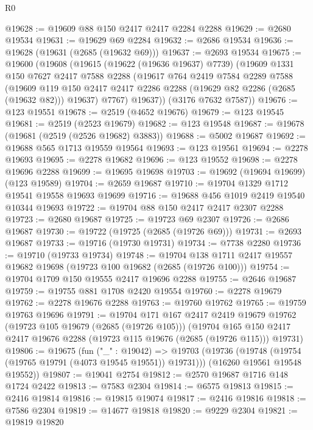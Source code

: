 \begin{lexlean}{R0}
\begin{coremodule}
@19628 := @19609 @88 @150 @2417 @2417 @2284 @2288
@19629 := @2680 @19534
@19631 := @19629 @69 @2284
@19632 := @2686 @19534
@19636 := @19628 (@19631 (@2685 (@19632 @69)))
@19637 := @2693 @19534
@19675 := @19600
    (@19608
      (@19615
        (@19622 (@19636 @19637) @7739)
        (@19609
          @1331
          @150
          @7627
          @2417
          @7588
          @2288
          (@19617
            @764
            @2419
            @7584
            @2289
            @7588
            (@19609
              @119
              @150
              @2417
              @2417
              @2286
              @2288
              (@19629 @82 @2286 (@2685 (@19632 @82)))
              @19637)
            @7767)
          @19637))
      (@3176 @7632 @7587))
@19676 := @123 @19551
@19678 := @2519 (@4652 @19676)
@19679 := @123 @19545
@19681 := @2519 (@2523 @19679)
@19682 := @123 @19548
@19687 := @19678 (@19681 (@2519 (@2526 @19682) @3883))
@19688 := @5002 @19687
@19692 := @19688 @565 @1713 @19559 @19564
@19693 := @123 @19561
@19694 := @2278 @19693
@19695 := @2278 @19682
@19696 := @123 @19552
@19698 := @2278 @19696 @2288
@19699 := @19695 @19698
@19703 := @19692 (@19694 @19699) (@123 @19589)
@19704 := @2659 @19687
@19710 := @19704 @1329 @1712 @19541 @19558 @19693 @19699
@19716 := @19688 @456 @1019 @2419 @19540 @10344 @19693
@19722 := @19704 @88 @150 @2417 @2417 @2307 @2288
@19723 := @2680 @19687
@19725 := @19723 @69 @2307
@19726 := @2686 @19687
@19730 := @19722 (@19725 (@2685 (@19726 @69)))
@19731 := @2693 @19687
@19733 := @19716 (@19730 @19731)
@19734 := @7738 @2280
@19736 := @19710 (@19733 @19734)
@19748 := @19704 @138 @1711 @2417 @19557 @19682 @19698 (@19723 @100 @19682 (@2685 (@19726 @100)))
@19754 := @19704 @1709 @150 @19555 @2417 @19696 @2288
@19755 := @2646 @19687
@19759 := @19755 @881 @1708 @2420 @19554
@19760 := @2278 @19679
@19762 := @2278 @19676 @2288
@19763 := @19760 @19762
@19765 := @19759 @19763 @19696
@19791 := @19704
    @171
    @167
    @2417
    @2419
    @19679
    @19762
    (@19723 @105 @19679 (@2685 (@19726 @105)))
    (@19704 @165 @150 @2417 @2417 @19676 @2288 (@19723 @115 @19676 (@2685 (@19726 @115))) @19731)
@19806 := @19675
    (fun ("_" : @19042) =>
    @19703
      (@19736 (@19748 (@19754 (@19765 @19791 (@4073 @19545 @19551)) @19731)))
      (@16260 @19561 @19548 @19552))
@19807 := @19041 @2754
@19812 := @2570 @19687 @1716 @148 @1724 @2422
@19813 := @7583 @2304
@19814 := @6575 @19813
@19815 := @2416 @19814
@19816 := @19815 @19074
@19817 := @2416 @19816
@19818 := @7586 @2304
@19819 := @14677 @19818
@19820 := @9229 @2304
@19821 := @19819 @19820

\end{coremodule}
\end{lexlean}
